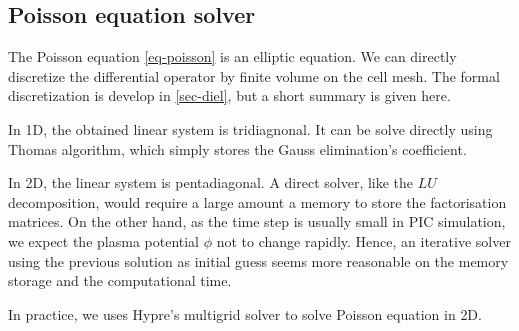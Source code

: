 \subsection{Poisson equation solver} \label{subsec-poissonintro}

The Poisson equation \vref{eq-poisson} is an elliptic equation.
We can directly discretize the differential operator by finite volume on the cell mesh.
The formal discretization is develop in \cref{sec-diel}, but a short summary is given here.

In \ac{1D}, the obtained linear system is tridiagnonal.
It can be solve directly using {\sc Thomas} algorithm, which simply stores the Gauss elimination's coefficient.

In \ac{2D}, the linear system is pentadiagonal.
A direct solver, like the $LU$ decomposition, would require a large amount a memory to store the factorisation matrices.
On the other hand, as the time step is usually small in \ac{PIC} simulation, we expect the plasma potential $\phi$ not to change rapidly.
Hence, an iterative solver using the previous solution as initial guess seems more reasonable on the memory storage and the computational time.

In practice, we uses {\sc Hypre}'s multigrid solver to solve Poisson equation in \ac{2D}.
